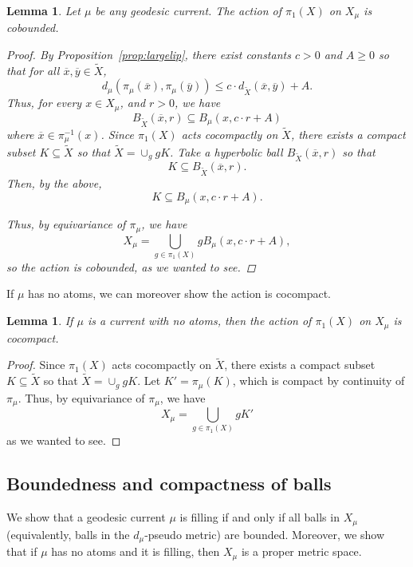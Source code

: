 \documentclass[12pt,article]{amsart}
\numberwithin{equation}{section}
\numberwithin{figure}{section}
\newtheorem{lemma}[equation]{Lemma}
\theoremstyle{definition}
\theoremstyle{plain}
\newcommand*{\wt}[1]{\widetilde{#1}}
\begin{document}
\begin{lemma}
Let $\mu$ be any geodesic current.
The action of $\pi_1(X)$ on $X_{\mu}$ is cobounded.
\label{lem:cocompact}
\begin{proof}
By Proposition~\ref{prop:largelip}, there exist constants $c>0$ and $A \geq 0$ so that for all $\overline{x},\overline{y} \in \wt{X}$,
\[
d_{\mu}(\pi_{\mu}(\overline{x}) ,\pi_{\mu}(\overline{y}))\leq c \cdot d_{\wt{X}}(\overline{x}, \overline{y}) + A.
\]
Thus, for every $x \in X_{\mu}$, and $r>0$, we have
\[
B_{\wt{X}}(\overline{x}, r ) \subseteq B_{\mu}(x ,c \cdot r + A)
\]
where $\overline{x} \in \pi_{\mu}^{-1}(x)$.
Since $\pi_1(X)$ acts cocompactly on $\wt{X}$, there exists a compact subset $K \subseteq \wt{X}$ so that $\wt{X} = \cup_g g K$.
Take a hyperbolic ball $B_{\wt{X}}(\overline{x},  r )$ so that 
\[
 K \subseteq B_{\wt{X}}(\overline{x}, r ).
\]
Then, by the above,
\[
 K \subseteq B_{\mu}(x, c \cdot r + A).
\]

Thus, by equivariance of $\pi_{\mu}$, we have
\[
X_{\mu}= \bigcup_{g \in \pi_1(X)} g B_{\mu}(x,c \cdot r + A),
\]
so the action is cobounded, as we wanted to see.
\end{proof}
\end{lemma}

If $\mu$ has no atoms, we can moreover show the action is cocompact.

\begin{lemma}
If $\mu$ is a current with no atoms, then the action of $\pi_1(X)$ on $X_{\mu}$ is cocompact.
\label{lem:real_cocompact}
\end{lemma}
\begin{proof}
Since $\pi_1(X)$ acts cocompactly on $\wt{X}$, there exists a compact subset $K \subseteq \wt{X}$ so that $\wt{X} = \cup_g g K$.
Let $K'=\pi_{\mu}(K)$, which is compact by continuity of $\pi_{\mu}$.
Thus, by equivariance of $\pi_{\mu}$, we have
\[
X_{\mu}= \bigcup_{g \in \pi_1(X)} g K'
\]
as we wanted to see.
\end{proof}


\subsection{Boundedness and compactness of balls}

We show that a geodesic current $\mu$ is filling if and only if all balls in  $X_{\mu}$ (equivalently, balls in the $d_{\mu}$-pseudo metric) are bounded. 
Moreover, we show that if $\mu$ has no atoms and it is filling, then $X_{\mu}$ is a proper metric space.
\end{document}
